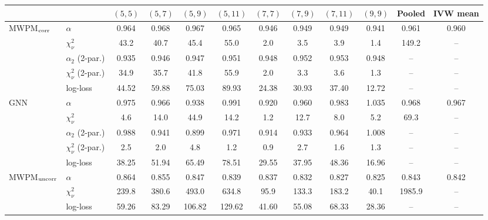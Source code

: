 \begin{tabular}{ll|cccccccc|c|c}
\toprule
 & & $(5, 5)$ & $(5, 7)$ & $(5, 9)$ & $(5, 11)$ & $(7, 7)$ & $(7, 9)$ & $(7, 11)$ & $(9, 9)$ & Pooled & IVW mean \\
\hline
\midrule
MWPM$_{\rm corr}$ & $\alpha$ & 0.964 & 0.968 & 0.967 & 0.965 & 0.946 & 0.949 & 0.949 & 0.941 & 0.961 & 0.960 \\
 & $\chi^2_\nu$ & 43.2 & 40.7 & 45.4 & 55.0 & 2.0 & 3.5 & 3.9 & 1.4 & 149.2 & -- \\
 & $\alpha_2$ (2-par.) & 0.935 & 0.946 & 0.947 & 0.951 & 0.948 & 0.952 & 0.953 & 0.948 & -- & -- \\
 & $\chi^2_\nu$ (2-par.) & 34.9 & 35.7 & 41.8 & 55.9 & 2.0 & 3.3 & 3.6 & 1.3 & -- & -- \\
 & log-loss & 44.52 & 59.88 & 75.03 & 89.93 & 24.38 & 30.93 & 37.40 & 12.72 & -- & -- \\
\hline
GNN & $\alpha$ & 0.975 & 0.966 & 0.938 & 0.991 & 0.920 & 0.960 & 0.983 & 1.035 & 0.968 & 0.967 \\
 & $\chi^2_\nu$ & 4.6 & 14.0 & 44.9 & 14.2 & 1.2 & 12.7 & 8.0 & 5.2 & 69.3 & -- \\
 & $\alpha_2$ (2-par.) & 0.988 & 0.941 & 0.899 & 0.971 & 0.914 & 0.933 & 0.964 & 1.008 & -- & -- \\
 & $\chi^2_\nu$ (2-par.) & 2.5 & 2.0 & 4.8 & 1.2 & 0.9 & 2.7 & 1.6 & 1.3 & -- & -- \\
 & log-loss & 38.25 & 51.94 & 65.49 & 78.51 & 29.55 & 37.95 & 48.36 & 16.96 & -- & -- \\
\hline
MWPM$_{\rm uncorr}$ & $\alpha$ & 0.864 & 0.855 & 0.847 & 0.839 & 0.837 & 0.832 & 0.827 & 0.825 & 0.843 & 0.842 \\
 & $\chi^2_\nu$ & 239.8 & 380.6 & 493.0 & 634.8 & 95.9 & 133.3 & 183.2 & 40.1 & 1985.9 & -- \\
 & log-loss & 59.26 & 83.29 & 106.82 & 129.62 & 41.60 & 55.08 & 68.33 & 28.36 & -- & -- \\
\bottomrule
\end{tabular}
